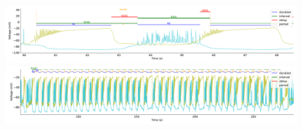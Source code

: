 \begin{figure}[htbp]
	\centering
	\begin{minipage}[b]{\textwidth}
		\centering
		\includegraphics[width=\textwidth]{./invariants/data/SUSSEX/CV1a_driven1/images/stim_cv1a1_signal_intervals_cycle.pdf}
		\includegraphics[width=\textwidth]{./invariants/data/SUSSEX/CV1a_driven1/images/stim_cv1a1_signal_intervals_zoom.pdf}
	\end{minipage}
	\centering
	\begin{minipage}[b]{0.43\textwidth}
		\centering

\end{minipage}
\end{figure}
